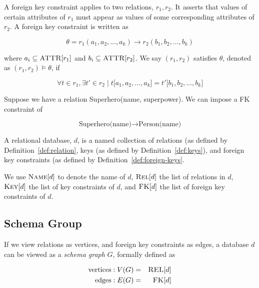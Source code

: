 	\begin{defn}
	\label{def:foreign-keys}
		A foreign key constraint applies to two relations, $r_1, r_2$.  It asserts that values of certain attributes of $r_1$ must appear as values of some corresponding attributes of $r_2$.  A foreign key constraint is written as
		
		$$\theta = r_1(a_1, a_2, \dotsc, a_k) \rightarrow r_2(b_1, b_2, \dotsc, b_k)$$
		
		where $a_i \subseteq \textsc{ATTR}\lbrack r_1\rbrack$ and $b_i \subseteq \textsc{ATTR}\lbrack r_2\rbrack$.  We say $(r_1, r_2)$ satisfies $\theta$, denoted as $(r_1, r_2) \models \theta$, if
		
		$$\forall t \in r_1, \exists t' \in r_2 \mid t\lbrack a_1, a_2, \dotsc, a_k\rbrack = t'\lbrack b_1, b_2, \dotsc, b_k]$$
		
		\begin{ex}
			Suppose we have a relation Superhero(name, superpower).  We can impose a FK constraint of
			
			$$\textrm{Superhero(name)} \rightarrow \textrm{Person(name)}$$
		\end{ex}
	\end{defn}
	
	\begin{defn}
	\label{def:relational-database}
		A relational database, $d$, is a named collection of relations (as defined by Definition~\ref{def:relation}, keys (as defined by Definition~\ref{def:keys}), and foreign key constraints (as defined by Definition~\ref{def:foreign-keys}.
		
		We use $\textsc{Name}\lbrack d\rbrack$ to denote the name of $d$, $\textsc{Rel}\lbrack d\rbrack$ the list of relations in $d$, $\textsc{Key}\lbrack d\rbrack$ the list of key constraints of $d$, and $\textsc{FK}\lbrack d\rbrack$ the list of foreign key constraints of $d$.
	\end{defn}
	
	\subsection{Schema Group}
		\begin{defn}
			If we view relations as vertices, and foreign key constraints as edges, a database $d$ can be viewed as a \emph{schema graph} $G$, formally defined as
			
			\begin{eqnarray*}
				\mathrm{vertices}:  V(G) &=& \textsc{REL}\lbrack d\rbrack \\
				\mathrm{edges}:  E(G) &=& \textsc{FK}\lbrack d\rbrack
			\end{eqnarray*}
		\end{defn}
		
